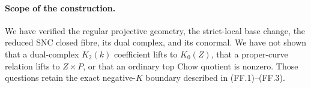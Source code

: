 \paragraph{Scope of the construction.}
We have verified the regular projective geometry, the strict-local
base change, the reduced SNC closed fibre, its dual complex, and its
conormal.  We have not shown that a dual-complex $K_2(k)$ coefficient
lifts to $K_0(Z)$, that a proper-curve relation lifts to $Z\times P$,
or that an ordinary top Chow quotient is nonzero.  Those questions
retain the exact negative-$K$ boundary described in (FF.1)--(FF.3).
